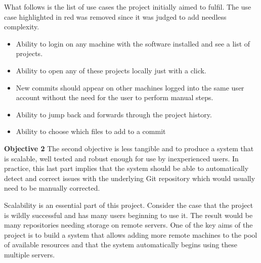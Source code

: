 What follows is the list of use cases the project initially aimed to fulfil. The use case highlighted in red was removed since it was judged to add needless complexity.

\begin{itemize}
\item Ability to login on any machine with the software installed and see a list of projects.
\item Ability to open any of these projects locally just with a click.
\item New commits should appear on other machines logged into the same user account without the need for the user to perform manual steps.
\item Ability to jump back and forwards through the project history.
\item \color{red}Ability to choose which files to add to a commit \color{black}
\end{itemize}

\noindent \textbf{Objective 2} The second objective is less tangible and to produce a system that is scalable, well tested and robust enough for use by inexperienced users. In practice, this last part implies that the system should be able to automatically detect and correct issues with the underlying Git repository which would usually need to be manually corrected.

Scalability is an essential part of this project. Consider the case that the project is wildly successful and has many users beginning to use it. The result would be many repositories needing storage on remote servers. One of the key aims of the project is to build a system that allows adding more remote machines to the pool of available resources and that the system automatically begins using these multiple servers.

